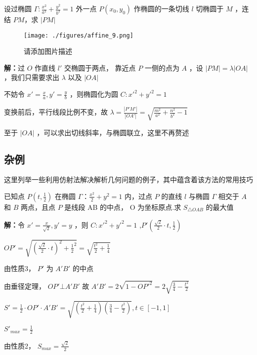 \begin{corollary}{}
设过椭圆 \(\Gamma:\frac{x^2}{a^2}+\frac{y^2}{b^2}=1\) 外一点 \(P(x_0,y_0)\) 作椭圆的一条切线 \(l\) 切椭圆于 \(M\) ，连结 \(PM\)，求 \(|PM|\)
\begin{figure}[ht]
\centering
\texttt{[image: ./figures/affine\_9.png]}
\caption{请添加图片描述} \label{affine_fig9}
\end{figure}
\textbf{解：}过 \(O\) 作直线 \(l'\) 交椭圆于两点， 靠近点 \(P\) 一侧的点为 \(A\) ，设 \(|PM|=\lambda|OA|\) ，我们只需要求出 \(\lambda\) 以及 \(|OA|\) 

不妨令 \(x'=\frac{x}{a},y'=\frac{y}{b}\) ，则椭圆化为圆 \(C:x'^2+y'^2=1\)

变换前后，平行线段比例不变，故 \(\lambda=\frac{|P'M'|}{|OA'|}=\sqrt{\frac{m^2}{a^2}+\frac{n^2}{b^2}-1}\) 

至于 \(|OA|\) ，可以求出切线斜率，与椭圆联立，这里不再赘述
\end{corollary}

\subsection{杂例}
这里列举一些利用仿射法解决解析几何问题的例子，其中蕴含着该方法的常用技巧
\begin{example}{}
已知点 \(P\left(t,\frac{1}{2}\right)\) 在椭圆 \(\Gamma：\frac{x^2}{2}+y^2=1\) 内，过点 \(P\) 的直线 \(l\) 与椭圆 \(\Gamma\) 相交于 \(A\) 和 \(B\) 两点，且点 \(P\) 是线段 AB 的中点， O 为坐标原点.求 \(S_{\triangle OAB}\) 的最大值

\textbf{解：}令 \(x'=\frac{x}{\sqrt{2}},y'=y\) ，则 \(C:x'^2+y'^2=1\) ,\(P'\left(\frac{\sqrt{2}}{2}\cdot t,\frac{1}{2}\right)\)

\(OP'=\sqrt{\left(\frac{\sqrt{2}}{2}\cdot t\right)^2+{\frac{1}{2}}^2}=\sqrt{\frac{t^2}{2}+\frac{1}{4}}\)

由性质3， \(P'\) 为 \(A'B'\) 的中点

由垂径定理， \(OP'\bot A'B'\) 
故 \(A'B'=2\sqrt{1-OP'^2}=2\sqrt{\frac{3}{4}-\frac{t^2}{2}}\)

\(S'=\frac{1}{2}\cdot OP' \cdot A'B'=\sqrt{\left(\frac{t^2}{2}+\frac{1}{4}\right)\left(\frac{3}{4}-\frac{t^2}{2}\right)},t\in[-1,1]\)

\(S'_{max}=\frac{1}{2}\)

由性质2， \(S_{max}=\frac{\sqrt{2}}{2}\) 
\end{example}

